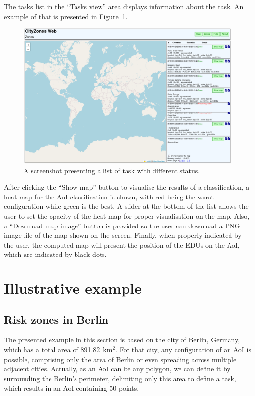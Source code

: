 \begin{refsection}
The tasks list in the ``Tasks view'' area displays information about the task. An example of that is presented in Figure~\ref{fig:web_zones}.

\begin{figure}[htb]
  \centering
  \includegraphics[width=.8\linewidth]{Chapters/3-CityZones/img/cityzones_zones_list.png}
  \caption{A screenshot presenting a list of task with different status.}\label{fig:web_zones}
\end{figure}

After clicking the ``Show map'' button to visualise the results of a classification, a heat-map for the AoI classification is shown, with red being the worst configuration while green is the best. A slider at the bottom of the list allows the user to set the opacity of the heat-map for proper visualisation on the map. Also, a ``Download map image'' button is provided so the user can download a PNG image file of the map shown on the screen. Finally, when properly indicated by the user, the computed map will present the position of the EDUs on the AoI, which are indicated by black dots.

\section{Illustrative example}

\subsection {Risk zones in Berlin}

The presented example in this section is based on the city of Berlin, Germany, which has a total area of 891.82~km$^2$. For that city, any configuration of an AoI is possible, comprising only the area of Berlin or even spreading across multiple adjacent cities. Actually, as an AoI can be any polygon, we can define it by surrounding the Berlin's perimeter, delimiting only this area to define a task, which results in an AoI containing 50 points.


\end{refsection}

